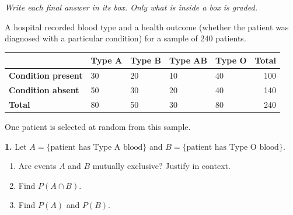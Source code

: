\documentclass[10pt]{article}
\begin{document}
{\small\itshape Write each final answer in its box. Only what is inside a box is graded.}\par

\vspace{0.1in}

\begin{practicebox}
\small
A hospital recorded blood type and a health outcome (whether the patient
was diagnosed with a particular condition) for a sample of 240 patients.

\vspace{6pt}
\renewcommand{\arraystretch}{1.4}
\begin{tabularx}{\linewidth}{@{} l X X X X r @{}}
 & \textbf{Type A} & \textbf{Type B} & \textbf{Type AB} & \textbf{Type O} & \textbf{Total} \\
\hline
\textbf{Condition present}  & 30 & 20 & 10 & 40 & 100 \\
\textbf{Condition absent}   & 50 & 30 & 20 & 40 & 140 \\
\hline
\textbf{Total}              & 80 & 50 & 30 & 80 & 240 \\
\end{tabularx}

\vspace{8pt}
One patient is selected at random from this sample.

\vspace{8pt}
\textbf{1.} Let $A = \{\text{patient has Type A blood}\}$ and
$B = \{\text{patient has Type O blood}\}$.

\begin{enumerate}[label=(\alph*), leftmargin=2em, itemsep=6pt]
  \item Are events $A$ and $B$ mutually exclusive? Justify in context.\\
  \item Find $P(A \cap B)$. \makebox[4cm][l]{\hspace{1.6cm}\smash{\raisebox{-4pt}{\gradedblank[id=hw1b, type=short, points=1, answer=0, check=numeric, tolerance=0]{2.4cm}{0.2in}}}}
  \item Find $P(A)$ and $P(B)$. 
\end{enumerate}


\end{practicebox}
\end{document}
